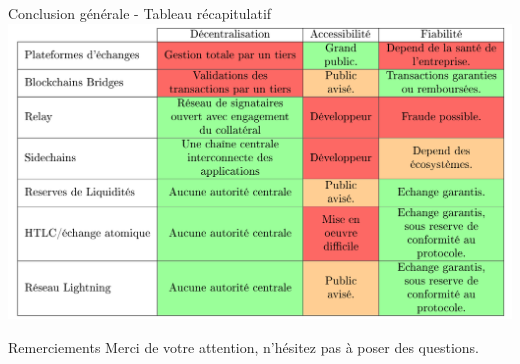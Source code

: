 \begin{frame}{Conclusion générale - Tableau récapitulatif}
    \centering
    \includegraphics[scale = 0.3] {conclusion/tableau.png}
\end{frame}

\begin{frame}{Remerciements}
    \centering
    Merci de votre attention, n'hésitez pas à poser des questions.
\end{frame}

